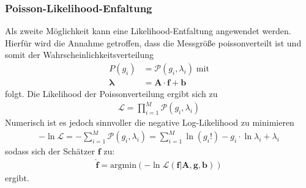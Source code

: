\subsubsection{Poisson-Likelihood-Enfaltung}
Als zweite Möglichkeit kann eine Likelihood-Entfaltung angewendet werden. 
Hierfür wird die Annahme getroffen, dass die Messgröße poissonverteilt ist und somit der Wahrscheinlichkeitsverteilung
\begin{align}
	P(g_{i}) &= \mathcal{P}(g_{i},\lambda_{i}) \; \text{mit}\\
	{\pmb{\lambda}} &= \pmb{A} \cdot {\pmb{f}} + {\pmb{b}}
\end{align}
folgt.
Die Likelihood der Poissonverteilung ergibt sich zu
\begin{align}
	\mathcal{L} = \prod_{i=1}^{M}\mathcal{P}(g_{i},\lambda_{i})
\end{align}
Numerisch ist es jedoch sinnvoller die negative Log-Likelihood zu minimieren
\begin{align}
	- \ln\mathcal{L} = - \sum_{i=1}^{M}\mathcal{P}(g_{i},\lambda_{i}) = \sum_{i=1}^{M}\ln(g_{i}!) - g_{i} \cdot \ln \lambda_{i} +\lambda_{i}
	\label{eqn:loglike}
\end{align}
sodass sich der Schätzer ${\pmb{f}}$ zu:
\begin{align}
	\hat{{\pmb{f}}} = \text{argmin}\left(- \ln\mathcal{L}( {\pmb{f}}|\pmb{A},{\pmb{g}},{\pmb{b}})\right)
	\label{eqn:fLike}
\end{align}
ergibt.

